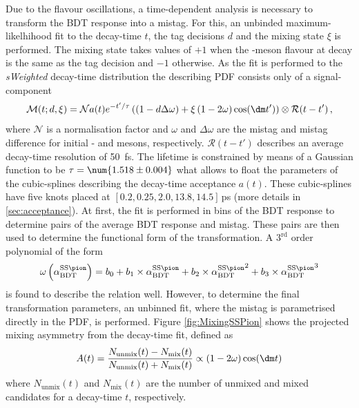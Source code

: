 Due to the flavour oscillations, a time-dependent analysis is necessary to transform the BDT response into a mistag.
For this, an unbinded maximum-likelhihood fit to the decay-time $t$, the tag decisions $d$ and the mixing state $\xi$ is performed.
The mixing state takes values of $+1$ when the \B-meson flavour at decay is the same as the tag decision and $-1$ otherwise.
As the fit is performed to the \emph{sWeighted} decay-time distribution the describing PDF consists only of a signal-component
\begin{equation}
\mathcal{M}(t;d,\xi)=\mathcal{N}a(t)e^{-t'/\tau}\left(\left(1-d\Delta\omega\right)+\xi\left(1-2\omega\right)\cos\!\left(\dm t'\right)\right)\otimes\mathcal{R}(t-t')\,,\label{eq:mixPDF}
\end{equation}
where $\mathcal{N}$ is a normalisation factor and $\omega$ and $\Delta\omega$ are the mistag and mistag difference for initial \Bz- and \Bzb mesons, respectively.
$\mathcal{R}(t-t')$ describes an average decay-time resolution of \SI{50}{\femto\second}.
The lifetime is constrained by means of a Gaussian function to be $\tau=\num{1.518\pm0.004}$ what allows to float the parameters of the cubic-splines describing the decay-time acceptance $a(t)$.
These cubic-splines have five knots placed at $[0.2, 0.25, 2.0, 13.8, 14.5]\,$\si{\pico\second} (more details in \cref{sec:acceptance}).
At first, the fit is performed in bins of the BDT response to determine pairs of the average BDT response and mistag.
These pairs are then used to determine the functional form of the transformation.
A $3^{\text{rd}}$ order polynomial of the form
\begin{equation}
\omega\left(\alpha^{\text{SS}\pion}_\text{BDT}\right)=b_0+b_1\times\alpha^{\text{SS}\pion}_\text{BDT}+b_2\times{\alpha^{\text{SS}\pion}_\text{BDT}}^2+b_3\times{\alpha^{\text{SS}\pion}_\text{BDT}}^3\label{eq:tranformfunc}
\end{equation}
is found to describe the relation well.
However, to determine the final transformation parameters, an unbinned fit, where the mistag is parametrised directly in the PDF, is performed.
Figure \eqref{fig:MixingSSPion} shows the projected mixing asymmetry from the decay-time fit, defined as
\begin{equation}
A(t)=\frac{N_{\text{unmix}}(t)-N_{\text{mix}}(t)}{N_{\text{unmix}}(t)+N_{\text{mix}}(t)}\propto\left(1-2\omega\right)\cos\!\left(\dm t\right)
\end{equation}
where $N_{\text{unmix}}(t)$ and $N_{\text{mix}}(t)$ are the number of unmixed  and mixed \Bz candidates for a decay-time $t$, respectively.
